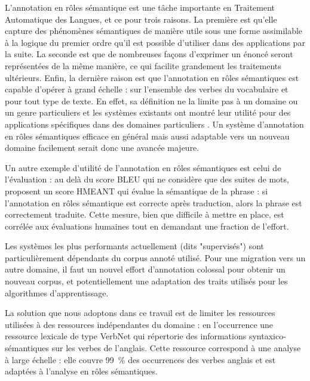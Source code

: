\documentclass[oneside,parskip]{scrbook}
\begin{document}
L'annotation en rôles sémantique est une tâche importante en Traitement
Automatique des Langues, et ce pour trois raisons. La première est qu'elle
capture des phénomènes sémantiques de manière utile sous une forme assimilable
à la logique du premier ordre qu'il est possible d'utiliser dans des
applications par la suite. La seconde est que de nombreuses façons d'exprimer
un énoncé seront représentées de la même manière, ce qui facilite grandement
les traitements ultérieurs. Enfin, la dernière raison est que l'annotation en
rôles sémantiques est capable d'opérer à grand échelle : sur l'ensemble des
verbes du vocabulaire et pour tout type de texte. En effet, sa définition ne la
limite pas à un domaine ou un genre particuliers et les systèmes existants ont
montré leur utilité pour des applications spécifiques dans des domaines
particuliers \citep{osman2012improved,xie2013semantic}. Un système
d'annotation en rôles sémantiques efficace en général mais aussi adaptable vers
un nouveau domaine facilement serait donc une avancée majeure.

Un autre exemple d'utilité de l'annotation en rôles sémantiques est celui de
l'évaluation : au delà du score BLEU qui ne considère que des suites de mots,
\cite{lo2011smt} proposent un score HMEANT qui évalue la sémantique de la
phrase : si l'annotation en rôles sémantique est correcte après traduction,
alors la phrase est correctement traduite. Cette mesure, bien que difficile à
mettre en place, est corrélée aux évaluations humaines tout en demandant une
fraction de l'effort.

Les systèmes les plus performants actuellement (dits "supervisés") sont
particulièrement dépendants du corpus annoté utilisé. Pour une migration vers
un autre domaine, il faut un nouvel effort d'annotation colossal pour obtenir
un nouveau corpus, et potentiellement une adaptation des traits utilisés pour
les algorithmes d'apprentissage.

La solution que nous adoptons dans ce travail est de limiter les ressources
utilisées à des ressources indépendantes du domaine : en l'occurrence une
ressource lexicale de type VerbNet qui répertorie des informations
syntaxico-sémantiques sur les verbes de l'anglais. Cette ressource correspond à
une analyse à large échelle : elle couvre 99~\% des occurrences des verbes
anglais \citep[partie 1, p~.53]{palmer2013semantic} et est adaptées à l'analyse
en rôles sémantiques.




\end{document}
